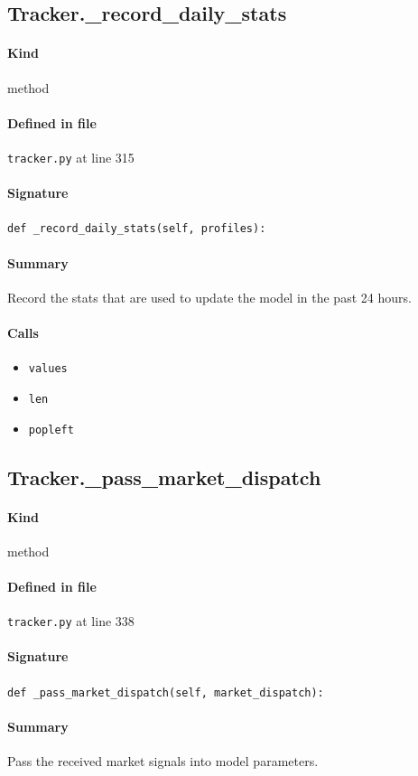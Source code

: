 \documentclass[11pt]{report}
\begin{document}
\subsection{Tracker.\_record\_daily\_stats}
\label{def:tracker.py:Tracker._record_daily_stats:L315}
\paragraph{Kind} method
\paragraph{Defined in file} \texttt{tracker.py} at line 315
\paragraph{Signature} \texttt{def \_record\_daily\_stats(self, profiles):}
\paragraph{Summary} Record the stats that are used to update the model in the past 24 hours.
\paragraph{Calls}
\begin{itemize}[leftmargin=*]
  \item \texttt{values}
  \item \texttt{len}
  \item \texttt{popleft}
\end{itemize}
\subsection{Tracker.\_pass\_market\_dispatch}
\label{def:tracker.py:Tracker._pass_market_dispatch:L338}
\paragraph{Kind} method
\paragraph{Defined in file} \texttt{tracker.py} at line 338
\paragraph{Signature} \texttt{def \_pass\_market\_dispatch(self, market\_dispatch):}
\paragraph{Summary} Pass the received market signals into model parameters.
\end{document}
